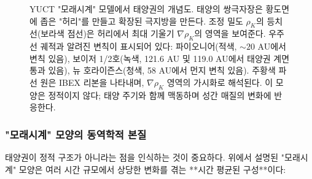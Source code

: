 \documentclass[11pt,a4paper]{article}
\theoremstyle{remark}
\begin{document}
\begin{figure}[htbp]
		\caption{YUCT "모래시계" 모델에서 태양권의 개념도. 태양의 쌍극자장은 황도면에 좁은 "허리"를 만들고 확장된 극지방을 만든다. 조정 밀도 $\rho_K$의 등치선(보라색 점선)은 허리에서 최대 기울기 $\nabla\rho_K$의 영역을 보여준다. 우주선 궤적과 알려진 변칙이 표시되어 있다: 파이오니어(적색, $\sim20$ AU에서 변칙 있음), 보이저 1/2호(녹색, 121.6 AU 및 119.0 AU에서 태양권 계면 통과 있음), 뉴 호라이즌스(청색, 58 AU에서 먼지 변칙 있음). 주황색 파선 원은 IBEX 리본을 나타내며, $\nabla\rho_K$ 영역의 가시화로 해석된다. 이 모양은 정적이지 않다; 태양 주기와 함께 맥동하며 성간 매질의 변화에 반응한다.}
		\label{fig:coord:heliosphere_hourglass}
	\end{figure}
	
	\subsubsection{"모래시계" 모양의 동역학적 본질}
	\label{subsubsec:coord:dynamic}
	
	태양권이 정적 구조가 아니라는 점을 인식하는 것이 중요하다. 위에서 설명된 "모래시계" 모양은 여러 시간 규모에서 상당한 변화를 겪는 **시간 평균된 구성**이다:
	
\end{document}
